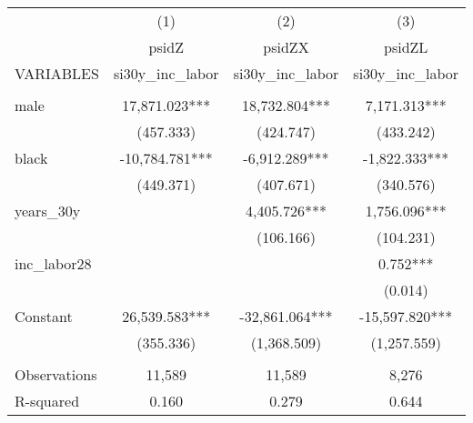 \begin{tabular}{lccc} \hline
 & (1) & (2) & (3) \\
 & psidZ & psidZX & psidZL \\
VARIABLES & si30y\_inc\_labor & si30y\_inc\_labor & si30y\_inc\_labor \\ \hline
 &  &  &  \\
male & 17,871.023*** & 18,732.804*** & 7,171.313*** \\
 & (457.333) & (424.747) & (433.242) \\
black & -10,784.781*** & -6,912.289*** & -1,822.333*** \\
 & (449.371) & (407.671) & (340.576) \\
years\_30y &  & 4,405.726*** & 1,756.096*** \\
 &  & (106.166) & (104.231) \\
inc\_labor28 &  &  & 0.752*** \\
 &  &  & (0.014) \\
Constant & 26,539.583*** & -32,861.064*** & -15,597.820*** \\
 & (355.336) & (1,368.509) & (1,257.559) \\
 &  &  &  \\
Observations & 11,589 & 11,589 & 8,276 \\
 R-squared & 0.160 & 0.279 & 0.644 \\ \hline
\end{tabular}
